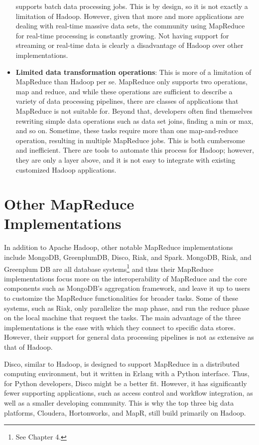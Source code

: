 \documentclass[]{krantz}
\begin{document}
\begin{itemize}
  supports batch data processing jobs. This is by design, so it is not
  exactly a limitation of Hadoop. However, given that more and more
  applications are dealing with real-time massive data sets, the
  community using MapReduce for real-time processing is constantly
  growing. Not having support for streaming or real-time data is clearly
  a disadvantage of Hadoop over other implementations.
\item
  \textbf{Limited data transformation operations}: This is more of a
  limitation of MapReduce than Hadoop per se. MapReduce only supports
  two operations, map and reduce, and while these operations are
  sufficient to describe a variety of data processing pipelines, there
  are classes of applications that MapReduce is not suitable for. Beyond
  that, developers often find themselves rewriting simple data
  operations such as data set joins, finding a min or max, and so on.
  Sometime, these tasks require more than one map-and-reduce operation,
  resulting in multiple MapReduce jobs. This is both cumbersome and
  inefficient. There are tools to automate this process for Hadoop;
  however, they are only a layer above, and it is not easy to integrate
  with existing customized Hadoop applications.
\end{itemize}

\section{Other MapReduce
Implementations}\label{other-mapreduce-implementations}

In addition to Apache Hadoop, other notable MapReduce implementations
include MongoDB, GreenplumDB, Disco, Riak, and Spark. MongoDB, Riak, and
Greenplum DB are all database systems\footnote{See Chapter 4.} and thus
their MapReduce implementations focus more on the interoperability of
MapReduce and the core components such as MongoDB's aggregation
framework, and leave it up to users to customize the MapReduce
functionalities for broader tasks. Some of these systems, such as Riak,
only parallelize the map phase, and run the reduce phase on the local
machine that request the tasks. The main advantage of the three
implementations is the ease with which they connect to specific data
stores. However, their support for general data processing pipelines is
not as extensive as that of Hadoop.

Disco, similar to Hadoop, is designed to support MapReduce in a
distributed computing environment, but it written in Erlang with a
Python interface. Thus, for Python developers, Disco might be a better
fit. However, it has significantly fewer supporting applications, such
as access control and workflow integration, as well as a smaller
developing community. This is why the top three big data platforms,
Cloudera, Hortonworks, and MapR, still build primarily on Hadoop.
\end{document}
